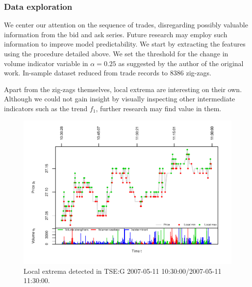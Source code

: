 \documentclass[]{article}
\begin{document}
\subsubsection{Data exploration}\label{data-exploration}

We center our attention on the sequence of trades, disregarding possibly
valuable information from the bid and ask series. Future research may
employ such information to improve model predictability. We start by
extracting the features using the procedure detailed above. We set the
threshold for the change in volume indicator variable in
\(\alpha = 0.25\) as suggested by the author of the original work.
In-sample dataset reduced from trade records to 8386 zig-zags.

Apart from the zig-zags themselves, local extrema are interesting on
their own. Although we could not gain insight by visually inspecting
other intermediate indicators such as the trend \(f_1\), further
research may find value in them.

\begin{figure}[H]
\includegraphics[width=\textwidth,height=0.4 \textheight]{main_files/figure-latex/unnamed-chunk-7-1} \caption{Local extrema detected in TSE:G 2007-05-11 10:30:00/2007-05-11 11:30:00. \label{tseg-ins-extrema}}\label{fig:unnamed-chunk-7}
\end{figure}
\end{document}
